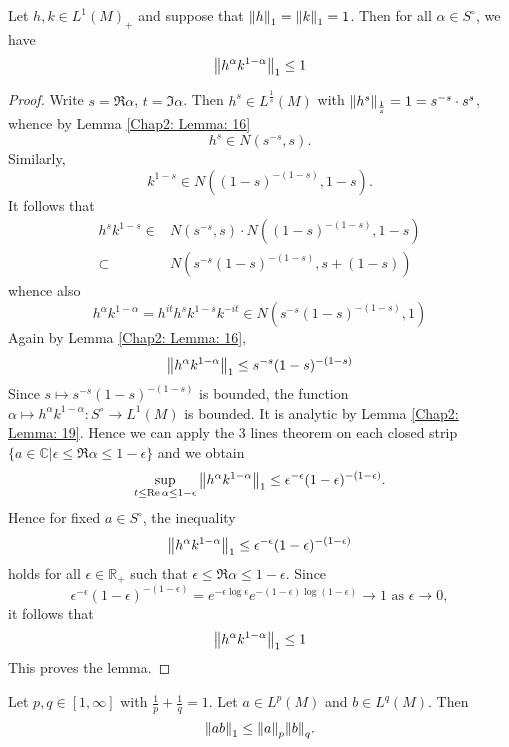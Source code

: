 \begin{lemma}\label{Chap2: Lemma: 22}
    Let $h,k\in L^1(M)_+$ and suppose that $\norm{h}_1=\norm{k}_1=1$. Then for all $\alpha\in S^\circ$, we have 
    \[
        \norm{h^\alpha k^{1-\alpha}}_1\leq 1
    \]
\end{lemma} 
\begin{proof}
    Write $s=\Re \alpha$, $t=\Im \alpha$. Then $h^s\in L^\frac{1}{s}(M)$ with $\norm{h^s}_{\frac{1}{s}}=1=s^{-s}\cdot s^s$, whence by Lemma \ref{Chap2: Lemma: 16} 
    \[
        h^s\in N(s^{-s},s).
    \]
    Similarly, 
    \[
        k^{1-s}\in N((1-s)^{-(1-s)},1-s).
    \]
    It follows that 
    \[
        \begin{split}
            h^s k^{1-s}\in& N(s^{-s},s)\cdot N((1-s)^{-(1-s)},1-s)\\
            \subset& N(s^{-s}(1-s)^{-(1-s)},s+(1-s))
        \end{split}
    \]
    whence also 
    \[
        h^\alpha k^{1-\alpha}=h^{it}h^s k^{1-s}k^{-it}\in N(s^{-s}(1-s)^{-(1-s)},1)
    \]
    Again by Lemma \ref{Chap2: Lemma: 16},
    \[
        \norm{h^\alpha k^{1-\alpha}}_1\leq s^{-s}(1-s)^{-(1-s)}
    \]
    Since $s\mapsto s^{-s}(1-s)^{-(1-s)}$ is bounded, the function $\alpha\mapsto h^\alpha k^{1-\alpha}:S^\circ \to L^1(M)$ is bounded. It is analytic by Lemma \ref{Chap2: Lemma: 19}. Hence we can apply the 3 lines theorem on each closed strip $\{a\in \mathbb{C}|\epsilon\leq \Re \alpha\leq 1-\epsilon\}$ and we obtain 
    \[
        \sup_{t\leq \Re \alpha\leq 1-\epsilon}\norm{h^\alpha k^{1-\alpha}}_1\leq \epsilon^{-\epsilon}(1-\epsilon)^{-(1-\epsilon)}.
    \]
    Hence for fixed $a\in S^\circ$, the inequality 
    \[
        \norm{h^\alpha k^{1-\alpha}}_1\leq \epsilon^{-\epsilon}(1-\epsilon)^{-(1-\epsilon)}
    \]
    holds for all $\epsilon\in \mathbb{R}_+$ such that $\epsilon\leq \Re \alpha\leq 1-\epsilon$. Since 
    \[
        \epsilon^{-\epsilon}(1-\epsilon)^{-(1-\epsilon)}=e^{-\epsilon\log \epsilon}e^{-(1-\epsilon)\log (1-\epsilon)}\to 1 \text{ as } \epsilon\to 0,
    \]
    it follows that 
    \[
        \norm{h^\alpha k^{1-\alpha}}_1\leq 1 
    \]
    This proves the lemma.
\end{proof}
\begin{theorem}
    Let $p,q\in [1,\infty]$ with $\frac{1}{p}+\frac{1}{q}=1$. Let $a\in L^p(M)$ and $b\in L^q(M)$. Then  
    \[
        \norm{ab}_1\leq \norm{a}_p\norm{b}_q.
    \]
\end{theorem}
